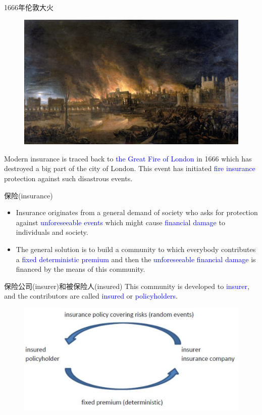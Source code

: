 \documentclass[professionalfont]{beamer}
\newcommand{\blue}[1]{\textcolor{blue}{#1}}
\begin{document}

\begin{frame}{1666年伦敦大火}
\begin{figure}
\centering
\includegraphics[width=0.8\linewidth]{Plots/london_fire.jpg}
\end{figure}
Modern insurance is traced back to \blue{the Great Fire of London} in 1666 which has destroyed a big part of the city of London. This event has initiated \blue{fire insurance} protection against such disastrous events. 
\end{frame}

\begin{frame}{保险(insurance)}
\begin{itemize}
\item Insurance originates from a general demand of society who asks for protection against \blue{unforeseeable events} which might cause \blue{financial damage} to individuals and society. 
\item The general solution is to build a community to which everybody contributes a \blue{fixed deterministic premium} and then the \blue{unforeseeable financial damage} is financed by the means of this community.
\end{itemize}
\end{frame}

\begin{frame}{保险公司(insurer)和被保险人(insured)}
This community is developed to \blue{insurer}, and the contributors are called \blue{insured} or \blue{policyholders}.
\begin{figure}
\centering
\includegraphics[width=0.8\linewidth]{Plots/insurance.png}
\end{figure}
\end{frame}
\end{document}
